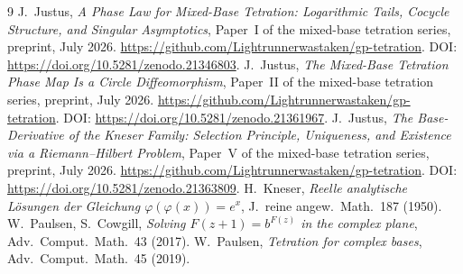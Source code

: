 \documentclass[11pt]{article}
\begin{document}
\begin{thebibliography}{9}
 J.~Justus, \emph{A Phase Law for Mixed-Base Tetration: Logarithmic Tails, Cocycle Structure, and Singular Asymptotics}, Paper~I of the mixed-base tetration series, preprint, July 2026. \url{https://github.com/Lightrunnerwastaken/gp-tetration}. DOI: \url{https://doi.org/10.5281/zenodo.21346803}.
 J.~Justus, \emph{The Mixed-Base Tetration Phase Map Is a Circle Diffeomorphism}, Paper~II of the mixed-base tetration series, preprint, July 2026. \url{https://github.com/Lightrunnerwastaken/gp-tetration}. DOI: \url{https://doi.org/10.5281/zenodo.21361967}.
 J.~Justus, \emph{The Base-Derivative of the Kneser Family: Selection Principle, Uniqueness, and Existence via a Riemann--Hilbert Problem}, Paper~V of the mixed-base tetration series, preprint, July 2026. \url{https://github.com/Lightrunnerwastaken/gp-tetration}. DOI: \url{https://doi.org/10.5281/zenodo.21363809}.
 H.~Kneser, \emph{Reelle analytische L\"osungen der Gleichung
$\varphi(\varphi(x))=e^x$}, J.~reine angew.~Math.\ 187 (1950).
 W.~Paulsen, S.~Cowgill, \emph{Solving $F(z+1)=b^{F(z)}$ in the
complex plane}, Adv.\ Comput.\ Math.\ 43 (2017).
 W.~Paulsen, \emph{Tetration for complex bases}, Adv.\ Comput.\
Math.\ 45 (2019).
\end{thebibliography}
\end{document}
